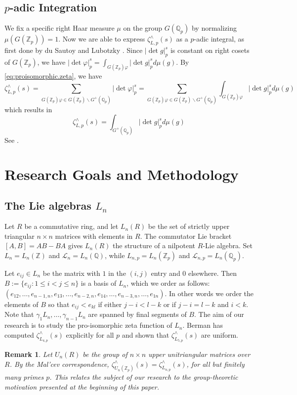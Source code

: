 \documentclass[12pt]{article}
\newtheorem{remark}[theorem]{Remark}
\begin{document}
\subsection{$p$-adic Integration}
We fix a specific right Haar measure $\mu$ on the group $G(\mathbb{Q}_{p})$ by normalizing $\mu(G(\mathbb{Z}_p))=1$. Now we are able to express $\zeta_{L,p}^{\wedge}(s)$ as a $p$-adic integral, as first done by du Sautoy and Lubotzky \cite{DuSautoyLubotzky}. Since $|\det{g}|_{p}^{s}$ is constant on right cosets of $G(\mathbb{Z}_{p})$, we have $|\det\varphi|_{p}^{s}=\displaystyle\int_{G(\mathbb{Z}_p)\varphi}{|\det{g}|_{p}^{s}}d\mu(g)$. By \eqref{eq:proisomorphic.zeta}, we have \[\zeta_{L,p}^{\wedge}(s)=\underset{\scriptscriptstyle G(\mathbb{Z}_p)\varphi\in G(\mathbb{Z}_p)\backslash{G^{+}(\mathbb{Q}_p)}}{\sum}|\det\varphi|_{p}^{s}=\underset{\scriptscriptstyle{G(\mathbb{Z}_p)}\varphi\in G(\mathbb{Z}_p)\backslash{G^{+}(\mathbb{Q}_p)}}{\sum}\displaystyle{\int_{G(\mathbb{Z}_p)\varphi}}{|\det{g}|_{p}^{s}}d\mu(g)\]
which results in \begin{equation}
\label{eq:p-adic.integral}
\zeta_{L,p}^{\wedge}(s)=\displaystyle\int_{G^{+}(\mathbb{Q}_p)}{|\det{g}|_{p}^{s}}d\mu(g)
\end{equation}
See \cite{GrunewaldSegalSmith}.
\section{Research Goals and Methodology}
\subsection{The Lie algebras $L_{n}$}
Let $R$ be a commutative ring, and let $L_{n}(R)$ be the set of strictly upper triangular $n\times{n}$ matrices with elements in $R$. The commutator Lie bracket $[A,B]=AB-BA$ gives $L_{n}(R)$ the structure of a nilpotent $R$-Lie algebra. Set $L_{n}=L_{n}(\mathbb{Z})$ and $\mathcal{L}_{n}=L_{n}(\mathbb{Q})$, while $L_{n,p}=L_{n}(\mathbb{Z}_{p})$ and $\mathcal{L}_{n,p}=L_{n}(\mathbb{Q}_{p})$.

Let $e_{ij}\in{L_{n}}$ be the matrix with $1$ in the $(i,j)$ entry and $0$ elsewhere. Then $B:=\{e_{ij} : 1\leq{i}<{j}\leq{n}\}$ is a basis of $L_{n}$, which we order as follows: $(e_{12},\dots,e_{n-1,n},e_{13},\dots,e_{n-2,n},e_{14},\dots,e_{n-3,n},\dots,e_{1n})$. In other words we order the elements of $B$ so that $e_{ij}<e_{kl}$ if either $j-i<l-k$ or if $j-i=l-k$ and $i<k$. Note that $\gamma_{1}L_{n},\dots,\gamma_{n-1}L_{n}$ are spanned by final segments of $B$. The aim of our research is to study the pro-isomorphic zeta function of $L_{n}$. Berman has computed $\zeta_{L_{4,p}}^{\wedge}(s)$ explicitly for all $p$ and shown that $\zeta_{L_{5,p}}^{\wedge}(s)$ are uniform.
\begin{remark}
Let $U_n(R)$ be the group of $n\times{n}$ upper unitriangular matrices over $R$. By the Mal'cev correspondence, ${\zeta^\wedge_{U_{n}(\mathbb{Z}_{p})}}(s)={\zeta^\wedge_{L_{n,p}}}(s)$, for all but finitely many primes $p$. This relates the subject of our research to the group-theoretic motivation presented at the beginning of this paper.
\end{remark}
\end{document}
